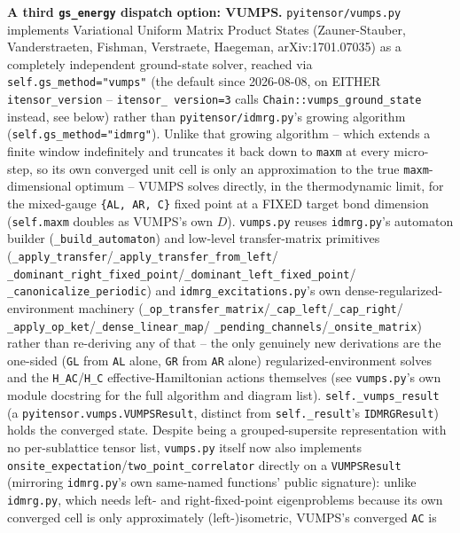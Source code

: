 \documentclass[11pt]{article}
\begin{document}
\textbf{A third \texttt{gs\_energy} dispatch option: VUMPS.}
\texttt{pyitensor/vumps.py} implements Variational Uniform Matrix
Product States (Zauner-Stauber, Vanderstraeten, Fishman, Verstraete,
Haegeman, arXiv:1701.07035) as a completely independent ground-state
solver, reached via \texttt{self.gs\_method="vumps"} (the default since
2026-08-08, on EITHER \texttt{itensor\_version} -- \texttt{itensor\_
version=3} calls \texttt{Chain::vumps\_ground\_state} instead, see
below) rather than \texttt{pyitensor/idmrg.py}'s growing algorithm
(\texttt{self.gs\_method="idmrg"}).
Unlike that growing algorithm -- which extends a finite window
indefinitely and truncates it back down to \texttt{maxm} at every
micro-step, so its own converged unit cell is only an
approximation to the true \texttt{maxm}-dimensional optimum -- VUMPS
solves directly, in the thermodynamic limit, for the mixed-gauge
\texttt{\{AL, AR, C\}} fixed point at a FIXED target bond dimension
(\texttt{self.maxm} doubles as VUMPS's own $D$). \texttt{vumps.py}
reuses \texttt{idmrg.py}'s automaton builder (\texttt{\_build\_automaton})
and low-level transfer-matrix primitives
(\texttt{\_apply\_transfer}/\texttt{\_apply\_transfer\_from\_left}/
\texttt{\_dominant\_right\_fixed\_point}/\texttt{\_dominant\_left\_fixed\_point}/
\texttt{\_canonicalize\_periodic}) and \texttt{idmrg\_excitations.py}'s
own dense-regularized-environment machinery
(\texttt{\_op\_transfer\_matrix}/\texttt{\_cap\_left}/\texttt{\_cap\_right}/
\texttt{\_apply\_op\_ket}/\texttt{\_dense\_linear\_map}/
\texttt{\_pending\_channels}/\texttt{\_onsite\_matrix}) rather than
re-deriving any of that -- the only genuinely new derivations are the
one-sided (\texttt{GL} from \texttt{AL} alone, \texttt{GR} from
\texttt{AR} alone) regularized-environment solves and the
\texttt{H\_AC}/\texttt{H\_C} effective-Hamiltonian actions themselves
(see \texttt{vumps.py}'s own module docstring for the full algorithm and
diagram list). \texttt{self.\_vumps\_result} (a
\texttt{pyitensor.vumps.VUMPSResult}, distinct from \texttt{self.\_result}'s
\texttt{IDMRGResult}) holds the converged state. Despite being a
grouped-supersite representation with no per-sublattice tensor list,
\texttt{vumps.py} itself now also implements
\texttt{onsite\_expectation}/\texttt{two\_point\_correlator} directly on
a \texttt{VUMPSResult} (mirroring \texttt{idmrg.py}'s own same-named
functions' public signature): unlike \texttt{idmrg.py}, which needs
left- and right-fixed-point eigenproblems because its own converged cell
is only approximately (left-)isometric, VUMPS's converged \texttt{AC} is
\end{document}
